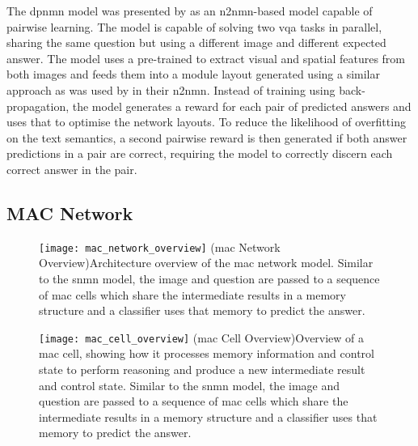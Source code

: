 The \gls{dpnmn} model was presented by \citeauthor{su_toward_2020} \cite{su_toward_2020} as an \gls{n2nmn}-based model capable of pairwise learning.
The model is capable of solving two \gls{vqa} tasks in parallel, sharing the same question but using a different image and different expected answer.
The model uses a pre-trained  to extract visual and spatial features from both images and feeds them into a module layout generated using a similar approach as was used by \citeauthor{hu_learning_2017} in their \gls{n2nmn}.
Instead of training using back-propagation, the model generates a reward for each pair of predicted answers and uses that to optimise the network layouts.
To reduce the likelihood of overfitting on the text semantics, a second pairwise reward is then generated if both answer predictions in a pair are correct, requiring the model to correctly discern each correct answer in the pair.

\subsection{MAC Network}
\label{subsec:mac_network}

\begin{figure}[htbp]
    \centering
    \texttt{[image: mac\_network\_overview]}
    \captionsource(\acrshort{mac} Network Overview){Architecture overview of the \acrshort{mac} network model. Similar to the \gls{snmn} model, the image and question are passed to a sequence of \acrshort{mac} cells which share the intermediate results in a memory structure and a classifier uses that memory to predict the answer. \label{fig:mac_network_overview}}{\citeauthor{hudson_compositional_2018}\cite{hudson_compositional_2018}}
\end{figure}
\begin{figure}[htbp]
    \centering
    \texttt{[image: mac\_cell\_overview]}
    \captionsource(\acrshort{mac} Cell Overview){Overview of a \acrshort{mac} cell, showing how it processes memory information and control state to perform reasoning and produce a new intermediate result and control state. Similar to the \gls{snmn} model, the image and question are passed to a sequence of \acrshort{mac} cells which share the intermediate results in a memory structure and a classifier uses that memory to predict the answer. \label{fig:mac_cell_overview}}{\citeauthor{hudson_compositional_2018}\cite{hudson_compositional_2018}}
\end{figure}


